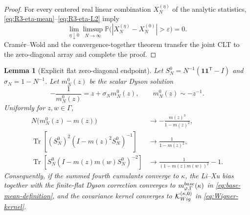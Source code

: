 \documentclass[10pt,a4paper]{amsart}
\newtheorem{lemma}[theorem]{Lemma}
\newcommand{\Tr}{\operatorname{Tr}}
\newcommand{\one}{\mathbf 1}
\begin{document}
\begin{proof}
For every centered real linear combination \(X_N^{(\eta)}\) of the analytic
statistics, \eqref{eq:R3-eta-mean}--\eqref{eq:R3-eta-L2} imply
\[
 \lim_{\eta\downarrow0}\limsup_{N\to\infty}
 \mathbb P\bigl(|X_N^{(\eta)}-X_N^{(0)}|>\varepsilon\bigr)=0.
\]
Cram\'er--Wold and the convergence-together theorem transfer the joint CLT
to the zero-diagonal array and complete the proof.
\end{proof}

\begin{lemma}[Explicit flat zero-diagonal endpoint]
\label{lem:R3-flat-endpoint}
Let
\(
 S_N^0=N^{-1}(\one\one^{\mathsf T}-I)
\)
and \(\sigma_N=1-N^{-1}\).  Let \(m_N^0(z)\) be the scalar Dyson solution
\begin{equation}\label{eq:R3-flat-endpoint-QVE}
 -\frac{1}{m_N^0(z)}=z+\sigma_Nm_N^0(z),
 \qquad m_N^0(z)\sim-z^{-1}.
\end{equation}
Uniformly for \(z,w\in\Gamma\),
\begin{align}
 N\bigl(m_N^0(z)-m(z)\bigr)
 &\longrightarrow-\frac{m(z)^3}{1-m(z)^2},
 \label{eq:R3-flat-Dyson-limit}\\
 \Tr\!\left[(S_N^0)^2(I-m(z)^2S_N^0)^{-1}\right]
 &\longrightarrow\frac{1}{1-m(z)^2},
 \label{eq:R3-flat-bias-trace}\\
 \Tr\!\left[S_N^0(I-m(z)m(w)S_N^0)^{-2}\right]
 &\longrightarrow
 \frac{1}{(1-m(z)m(w))^2}-1.
 \label{eq:R3-flat-cov-trace}
\end{align}
Consequently, if the summed fourth cumulants converge to \(\kappa\), the
Li--Xu bias together with the finite-flat Dyson correction converges to
\(m_{\varphi,\Gamma}^{\rm base}(\kappa)\) in
\eqref{eq:base-mean-definition}, and the covariance kernel converges to
\(\mathcal K_{\rm Wig}^{(\kappa,0)}\) in
\eqref{eq:Wigner-kernel}.
\end{lemma}
\end{document}
